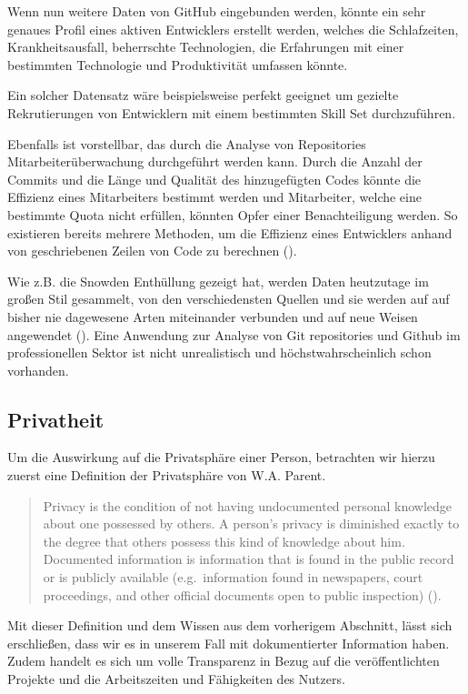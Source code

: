 \documentclass[12pt,a4paper]{article}
\begin{document}
Wenn nun weitere Daten von GitHub eingebunden werden, könnte ein sehr genaues Profil eines aktiven Entwicklers erstellt werden, welches die Schlafzeiten, Krankheitsausfall, beherrschte Technologien, die Erfahrungen mit einer bestimmten Technologie und Produktivität umfassen könnte.

Ein solcher Datensatz wäre beispielsweise perfekt geeignet um gezielte Rekrutierungen von Entwicklern mit einem bestimmten Skill Set durchzuführen.

Ebenfalls ist vorstellbar, das durch die Analyse von Repositories Mitarbeiterüberwachung durchgeführt werden kann.
Durch die Anzahl der Commits und die Länge und Qualität des hinzugefügten Codes könnte die Effizienz eines Mitarbeiters bestimmt werden und Mitarbeiter, welche eine bestimmte Quota nicht erfüllen, könnten Opfer einer Benachteiligung werden.
So existieren bereits mehrere Methoden, um die Effizienz eines Entwicklers anhand von geschriebenen Zeilen von Code zu berechnen (\cite{inproc:measuring-loc}).

Wie z.B. die Snowden Enthüllung gezeigt hat, werden Daten heutzutage im großen Stil gesammelt, von den verschiedensten Quellen und sie werden auf auf bisher nie dagewesene Arten miteinander verbunden und auf neue Weisen angewendet (\cite[p.~4]{article:snowden}).
Eine Anwendung zur Analyse von Git repositories und Github im professionellen Sektor ist nicht unrealistisch und höchstwahrscheinlich schon vorhanden.


\subsection{Privatheit}

Um die Auswirkung auf die Privatsphäre einer Person, betrachten wir hierzu zuerst eine Definition der Privatsphäre von W.A. Parent.

\begin{quote}
Privacy is the condition of not having undocumented personal knowledge about one possessed by others. A person's privacy is diminished exactly to the degree that others possess this kind of knowledge about him.
Documented information is information that is found in the public record or is publicly available (e.g.~information found in newspapers, court proceedings, and other official documents open to public inspection) (\cite[p.~203]{paper:privacymorality}).
\end{quote}

Mit dieser Definition und dem Wissen aus dem vorherigem Abschnitt, lässt sich erschließen, dass wir es in unserem Fall mit dokumentierter Information haben.
Zudem handelt es sich um volle Transparenz in Bezug auf die veröffentlichten Projekte und die Arbeitszeiten und Fähigkeiten des Nutzers.
\end{document}
